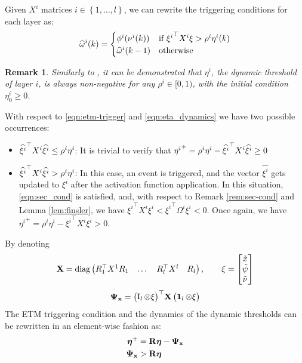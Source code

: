 \documentclass{ifacconf}
\theoremstyle{plain}
\newtheorem{remark}{Remark}
\begin{document}
Given $X^i$ matrices $i \in \left\{1, \dots, l \right\}$, we can rewrite the triggering conditions for each layer as:
\begin{equation}\label{eqn:etm-trigger}
  \widehat{\omega}^{i}(k) = \begin{cases}
    \phi^i(\nu^i(k)) & \text{if } {\xi^i}^\top X^i \xi > \rho^i \eta^i(k)\\
    \widehat{\omega}^{i}(k-1) & \text{otherwise}
  \end{cases}
\end{equation}
\begin{remark}\label{rem:eta-positive} \emph{Similarly to \citep[Lemma 3]{data-driven}, it can be demonstrated that $\eta^i$, the dynamic threshold of layer $i$, is always non-negative for any $\rho^i \in [0, 1)$, with the initial condition $\eta^i_0 \geq 0$.} \end{remark}
With respect to \eqref{eqn:etm-trigger} and \eqref{eqn:eta_dynamics} we have two possible occurrences:
\begin{itemize}
    \item $\widehat{{\xi^i}}^\top X^i \widehat{\xi^i} \leq \rho^i \eta^i$: It is trivial to verify that ${\eta^i}^+ = \rho^i \eta^i - \widehat{{\xi^i}}^\top X^i \widehat{\xi^i} \geq 0 $
    \item $\widehat{\xi^i}^\top X^i \widehat{\xi^i} > \rho^i \eta^i$: In this case, an event is triggered, and the vector $\widehat{\xi^i}$ gets updated to $\xi^i$ after the activation function application. In this situation, \eqref{eqn:sec_cond} is satisfied, and, with respect to Remark \ref{rem:sec-cond} and Lemma \ref{lem:finsler}, we have ${\xi^i}^\top X^i \xi^i < {\xi^i}^\top \Omega^i \xi^i < 0$. Once again, we have ${\eta^i}^+ = \rho^i \eta^i - {\xi^i}^\top X^i \xi^i > 0$.
\end{itemize}
By denoting 
\begin{equation}
    {\bf{X}} = \text{diag} \left(\begin{matrix}R_1^\top X^1 R_1 & \dots & R_l^\top X^l & R_l\end{matrix}\right), \qquad \xi = \left[\begin{matrix}\tilde{x} \\ \tilde{\psi} \\ \tilde{\nu}\end{matrix}\right]
\end{equation}
\begin{equation}\label{eqn:final-psi}
    \mathbf{\Psi_x} = \left(\begin{matrix}\operatorname{I}_l \otimes \xi\end{matrix}\right)^\top\! {\bf{X}} \left(\begin{matrix}\operatorname{\mathbf{1}}_l \otimes \xi\end{matrix}\right)
\end{equation}
The ETM triggering condition and the dynamics of the dynamic thresholds can be rewritten in an element-wise fashion as:
\begin{equation}
\begin{aligned}
    \boldsymbol{\eta}^+ &= {\bf{R}} \boldsymbol{\eta} - \mathbf{\Psi_x}\\
    \mathbf{\Psi_x} &> {\bf{R}} \boldsymbol{\eta}\end{aligned}
\end{equation}
\end{document}

